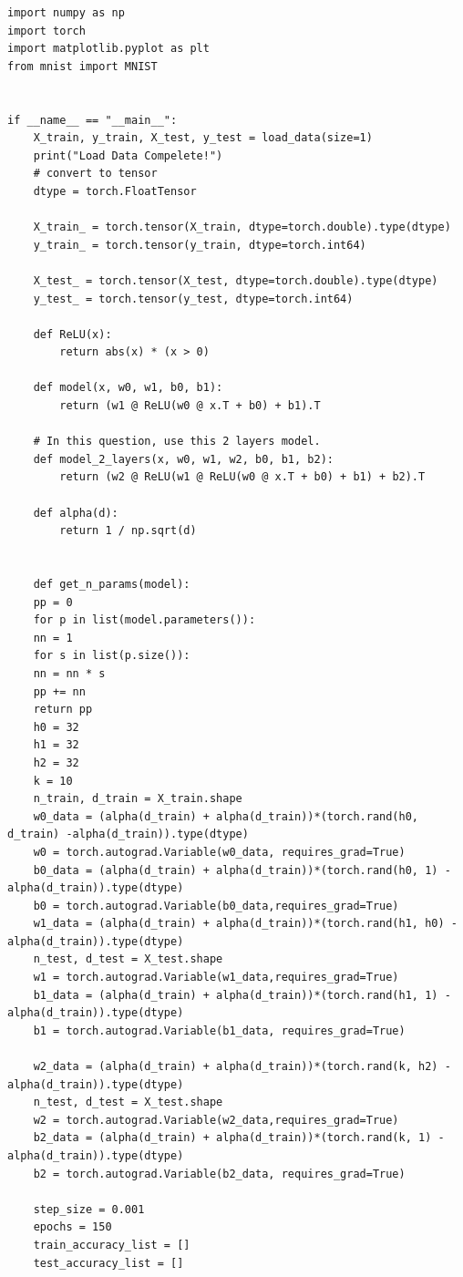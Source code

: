 \documentclass{article}
\begin{document}
\begin{verbatim}
import numpy as np
import torch
import matplotlib.pyplot as plt
from mnist import MNIST


if __name__ == "__main__":
	X_train, y_train, X_test, y_test = load_data(size=1)
	print("Load Data Compelete!")
	# convert to tensor
	dtype = torch.FloatTensor
	
	X_train_ = torch.tensor(X_train, dtype=torch.double).type(dtype)
	y_train_ = torch.tensor(y_train, dtype=torch.int64)
	
	X_test_ = torch.tensor(X_test, dtype=torch.double).type(dtype)
	y_test_ = torch.tensor(y_test, dtype=torch.int64)
	
	def ReLU(x):
		return abs(x) * (x > 0)
	
	def model(x, w0, w1, b0, b1):
		return (w1 @ ReLU(w0 @ x.T + b0) + b1).T
	
	# In this question, use this 2 layers model.
	def model_2_layers(x, w0, w1, w2, b0, b1, b2):
		return (w2 @ ReLU(w1 @ ReLU(w0 @ x.T + b0) + b1) + b2).T
		
	def alpha(d):
		return 1 / np.sqrt(d)
	
	
	def get_n_params(model):
	pp = 0
	for p in list(model.parameters()):
	nn = 1
	for s in list(p.size()):
	nn = nn * s
	pp += nn
	return pp
	h0 = 32
	h1 = 32
	h2 = 32
	k = 10
	n_train, d_train = X_train.shape
	w0_data = (alpha(d_train) + alpha(d_train))*(torch.rand(h0, d_train) -alpha(d_train)).type(dtype)
	w0 = torch.autograd.Variable(w0_data, requires_grad=True)
	b0_data = (alpha(d_train) + alpha(d_train))*(torch.rand(h0, 1) -alpha(d_train)).type(dtype)
	b0 = torch.autograd.Variable(b0_data,requires_grad=True)
	w1_data = (alpha(d_train) + alpha(d_train))*(torch.rand(h1, h0) -alpha(d_train)).type(dtype)
	n_test, d_test = X_test.shape
	w1 = torch.autograd.Variable(w1_data,requires_grad=True)
	b1_data = (alpha(d_train) + alpha(d_train))*(torch.rand(h1, 1) -alpha(d_train)).type(dtype)
	b1 = torch.autograd.Variable(b1_data, requires_grad=True)
	
	w2_data = (alpha(d_train) + alpha(d_train))*(torch.rand(k, h2) -alpha(d_train)).type(dtype)
	n_test, d_test = X_test.shape
	w2 = torch.autograd.Variable(w2_data,requires_grad=True)
	b2_data = (alpha(d_train) + alpha(d_train))*(torch.rand(k, 1) -alpha(d_train)).type(dtype)
	b2 = torch.autograd.Variable(b2_data, requires_grad=True)
	
	step_size = 0.001
	epochs = 150
	train_accuracy_list = []
	test_accuracy_list = []
	

\end{verbatim}
\end{document}
